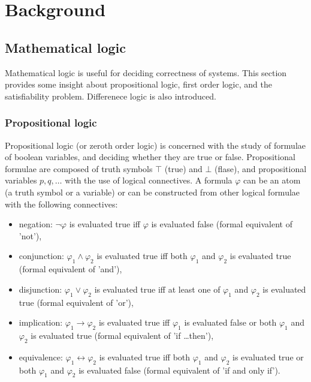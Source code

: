 \chapter{Background}
\label{chap:background}


\section{Mathematical logic}


Mathematical logic is useful for deciding correctness of systems. This section provides some insight about propositional logic, first order logic, and the satisfiability problem. Differenece logic is also introduced.

\subsection{Propositional logic}

Propositional logic (or zeroth order logic) is concerned with the study of formulae of boolean variables, and deciding whether they are true or false. Propositional formulae are composed of truth symbols $\top$ (true) and $\bot$ (flase),  and propositional variables $p,q, \dots$ with the use of logical connectives. A formula $\varphi$ can be an atom (a truth symbol or a variable) or can be constructed from other logical formulae with the following connectives:

\begin{itemize}
	\item negation: $\neg\varphi$ is evaluated true iff $\varphi$ is evaluated false (formal equivalent of 'not'),
	\item conjunction: $\varphi_1 \wedge \varphi_2$ is evaluated true iff  both $\varphi_1$ and $\varphi_2$ is evaluated true (formal equivalent of 'and'),
	\item disjunction: $\varphi_1 \vee \varphi_2$ is evaluated true iff  at least one of $\varphi_1$ and $\varphi_2$ is evaluated true (formal equivalent of 'or'),
	\item implication: $\varphi_1 \to \varphi_2$ is evaluated true iff  $\varphi_1$ is evaluated false or both $\varphi_1$ and $\varphi_2$ is evaluated true (formal equivalent of 'if \ldots then'),
	\item equivalence: $\varphi_1 \leftrightarrow \varphi_2$ is evaluated true iff   both $\varphi_1$ and $\varphi_2$ is evaluated true or  both $\varphi_1$ and $\varphi_2$ is evaluated false (formal equivalent of 'if and only if').
\end{itemize}

